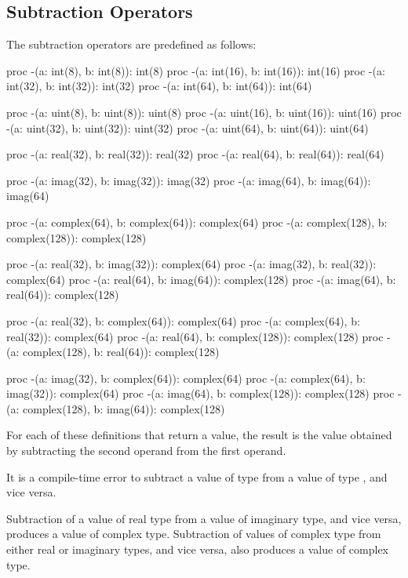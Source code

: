 \pagebreak
\subsection{Subtraction Operators}
\label{Subtraction_Operators}

The subtraction operators are predefined as follows:
\begin{chapel}
proc -(a: int(8), b: int(8)): int(8)
proc -(a: int(16), b: int(16)): int(16)
proc -(a: int(32), b: int(32)): int(32)
proc -(a: int(64), b: int(64)): int(64)

proc -(a: uint(8), b: uint(8)): uint(8)
proc -(a: uint(16), b: uint(16)): uint(16)
proc -(a: uint(32), b: uint(32)): uint(32)
proc -(a: uint(64), b: uint(64)): uint(64)

proc -(a: real(32), b: real(32)): real(32)
proc -(a: real(64), b: real(64)): real(64)

proc -(a: imag(32), b: imag(32)): imag(32)
proc -(a: imag(64), b: imag(64)): imag(64)

proc -(a: complex(64), b: complex(64)): complex(64)
proc -(a: complex(128), b: complex(128)): complex(128)

proc -(a: real(32), b: imag(32)): complex(64)
proc -(a: imag(32), b: real(32)): complex(64)
proc -(a: real(64), b: imag(64)): complex(128)
proc -(a: imag(64), b: real(64)): complex(128)

proc -(a: real(32), b: complex(64)): complex(64)
proc -(a: complex(64), b: real(32)): complex(64)
proc -(a: real(64), b: complex(128)): complex(128)
proc -(a: complex(128), b: real(64)): complex(128)

proc -(a: imag(32), b: complex(64)): complex(64)
proc -(a: complex(64), b: imag(32)): complex(64)
proc -(a: imag(64), b: complex(128)): complex(128)
proc -(a: complex(128), b: imag(64)): complex(128)
\end{chapel}
For each of these definitions that return a value, the result is the
value obtained by subtracting the second operand from the first
operand.

It is a compile-time error to subtract a value of type 
from a value of type , and vice versa.

Subtraction of a value of real type from a value of imaginary type,
and vice versa, produces a value of complex type.  Subtraction of
values of complex type from either real or imaginary types, and vice
versa, also produces a value of complex type.

